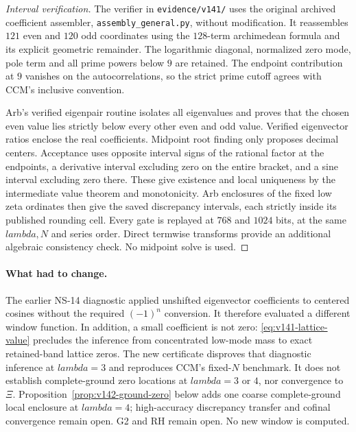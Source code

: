 \documentclass[11pt]{article}
\def\lambda{lambda}%
\theoremstyle{remark}
\begin{document}
\begin{proof}[Interval verification]
The verifier in \texttt{evidence/v141/} uses the original archived
coefficient assembler, \texttt{assembly\_general.py}, without modification.
It reassembles $121$ even and $120$ odd coordinates using the
$128$-term archimedean formula and its explicit geometric remainder.
The logarithmic diagonal, normalized zero mode, pole term and all
prime powers below $9$ are retained. The endpoint contribution at
$9$ vanishes on the autocorrelations, so the strict prime cutoff
agrees with CCM's inclusive convention.

Arb's verified eigenpair routine isolates all eigenvalues and proves
that the chosen even value lies strictly below every other even and
odd value. Verified eigenvector ratios enclose the real coefficients.
Midpoint root finding only proposes decimal centers. Acceptance uses
opposite interval signs of the rational factor at the endpoints,
a derivative interval excluding zero on the entire bracket, and a
sine interval excluding zero there. These give existence and local
uniqueness by the intermediate value theorem and monotonicity.
Arb enclosures of the fixed low zeta ordinates then give the saved
discrepancy intervals, each strictly inside its published rounding
cell. Every gate is replayed at $768$ and $1024$ bits, at the same
$\lambda,N$ and series order. Direct termwise transforms provide an
additional algebraic consistency check. No midpoint solve is used.
\end{proof}

\paragraph{What had to change.}
The earlier NS-14 diagnostic applied unshifted eigenvector coefficients
to centered cosines without the required $(-1)^n$ conversion. It
therefore evaluated a different window function. In addition, a small
coefficient is not zero: \eqref{eq:v141-lattice-value} precludes the
inference from concentrated low-mode mass to exact retained-band
lattice zeros. The new certificate disproves that diagnostic inference
at $\lambda=3$ and reproduces CCM's fixed-$N$ benchmark. It does not
establish complete-ground zero locations at $\lambda=3$ or $4$, nor
convergence to $\Xi$. Proposition~\ref{prop:v142-ground-zero} below
adds one coarse complete-ground local enclosure at $\lambda=4$;
high-accuracy discrepancy transfer and cofinal convergence remain open.
G2 and RH remain open. No new window is computed.
\end{document}

